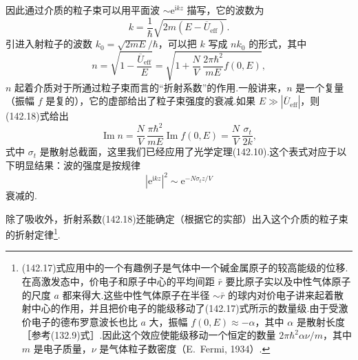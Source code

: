 因此通过介质的粒子束可以用平面波 $\sim\mathrm{e}^{\mathrm{i}kz}$ 描写，它的波数为
\begin{equation*}
  k=\frac{1}{\hbar}\sqrt{2m(E-\overline{U}_{\mathrm{eff}})}.
\end{equation*}
引进入射粒子的波数 $k_0=\sqrt{2mE}/\hbar$，可以把 $k$ 写成 $nk_0$ 的形式，其中
\begin{equation}
  n=\sqrt{1-\frac{\overline{U}_{\mathrm{eff}}}{E}}
  =\sqrt{1+\frac{N}{V}\,\frac{2\pi\hbar^2}{mE}f(0,E)},
\end{equation}
$n$ 起着介质对于所通过粒子束而言的“折射系数”的作用.一般讲来，$n$ 是一个复量（振幅 $f$ 是复的），它的虚部给出了粒子束强度的衰减.如果 $E\gg|\overline{U}_{\mathrm{eff}}|$，则(142.18)式给出
\begin{equation*}
  \operatorname{Im}n=\frac{N}{V}\,\frac{\pi\hbar^2}{mE}\operatorname{Im}f(0,E)
  =\frac{N}{V}\,\frac{\sigma_t}{2k},
\end{equation*}
式中 $\sigma_t$ 是散射总截面，这里我们已经应用了光学定理(142.10).这个表式对应于以下明显结果：波的强度是按规律
\begin{equation*}
  |\mathrm{e}^{\mathrm{i}kz}|^2\sim\mathrm{e}^{-N\sigma_tz/V}
\end{equation*}
衰减的.

除了吸收外，折射系数(142.18)还能确定（根据它的实部）出入这个介质的粒子束的折射定律\footnote{(142.17)式应用中的一个有趣例子是气体中一个碱金属原子的较高能级的位移.在高激发态中，价电子和原子中心的平均间距 $\bar{r}$ 要比原子实以及中性气体原子的尺度 $a$ 都来得大.这些中性气体原子在半径 $\sim\bar{r}$ 的球内对价电子讲来起着散射中心的作用，并且把价电子的能级移动了(142.17)式所示的数量级.由于受激价电子的德布罗意波长也比 $a$ 大，振幅 $f(0,E)\approx-\alpha$，其中 $\alpha$ 是散射长度［参考(132.9)式］.因此这个效应使能级移动一个恒定的数量 $2\pi\hbar^2\alpha\nu/m$，其中 $m$ 是电子质量，$\nu$ 是气体粒子数密度（E.~Fermi, 1934）.}.

